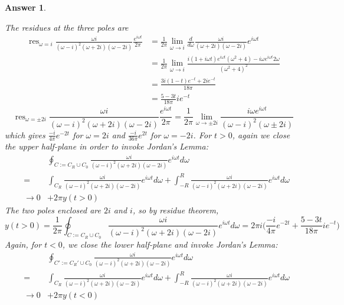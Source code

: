 \documentclass[a4paper]{article}
\DeclareMathOperator{\res}{res}
\newtheorem{ans}{Answer}[section]
\theoremstyle{new}
\begin{document}
\begin{ans}
\begin{enumerate}[label=(\alph*)]
\begin{center}
  \end{center}
The residues at the three poles are
\begin{align}
\res_{\omega=i}\frac{\omega i}{(\omega-i)^2(\omega+2i)(\omega-2i)}\frac{e^{i\omega t}}{2\pi}&=\frac{1}{2\pi}\lim_{\omega\rightarrow i}\frac{d}{d\omega}\frac{\omega i}{(\omega+2i)(\omega-2i)}e^{i\omega t}\nonumber\\&=\frac{1}{2\pi}\lim_{\omega\rightarrow i}\frac{i(1+i\omega t)e^{i\omega t}(\omega^2+4)-i\omega e^{i\omega t}2\omega}{(\omega^2+4)^2}\nonumber\\&=\frac{3i(1-t)e^{-t}+2ie^{-t}}{18\pi}\nonumber\\&=\frac{5-3t}{18\pi}ie^{-t}\nonumber
\end{align}
$$\res_{\omega=\pm 2i}\frac{\omega i}{(\omega-i)^2(\omega+2i)(\omega-2i)}\frac{e^{i\omega t}}{2\pi}=\frac{1}{2\pi}\lim_{\omega\rightarrow\pm 2i}\frac{i\omega e^{i\omega t}}{(\omega-i)^2(\omega\pm 2i)}$$
which gives $\frac{-i}{4\pi}e^{-2t}$ for $\omega=2i$ and $\frac{-i}{36\pi}e^{2t}$ for $\omega=-2i$. For $t>0$, again we close the upper half-plane in order to invoke Jordan's Lemma:
\begin{eqnarray}
&&\oint_{C:=C_R\cup C_0}\frac{\omega i}{(\omega-i)^2(\omega+2i)(\omega-2i)}e^{i\omega t}d\omega\nonumber\\&=&\int_{C_R}\frac{\omega i}{(\omega-i)^2(\omega+2i)(\omega-2i)}e^{i\omega t}d\omega+\int_{-R}^R\frac{\omega i}{(\omega-i)^2(\omega+2i)(\omega-2i)}e^{i\omega t}d\omega\nonumber\\&\rightarrow 0&+2\pi y(t>0)\nonumber
\end{eqnarray}
The two poles enclosed are $2i$ and $i$, so by residue theorem,
$$y(t>0)=\frac{1}{2\pi}\oint_{C:=C_R\cup C_0}\frac{\omega i}{(\omega-i)^2(\omega+2i)(\omega-2i)}e^{i\omega t}d\omega=2\pi i\bigg(\frac{-i}{4\pi}e^{-2t}+\frac{5-3t}{18\pi}ie^{-t}\bigg)$$
Again, for $t<0$, we close the lower half-plane and invoke Jordan's Lemma:
\begin{eqnarray}
&&\oint_{C':=C_R'\cup C_0}\frac{\omega i}{(\omega-i)^2(\omega+2i)(\omega-2i)}e^{i\omega t}d\omega\nonumber\\&=&\int_{C_R}\frac{\omega i}{(\omega-i)^2(\omega+2i)(\omega-2i)}e^{i\omega t}d\omega+\int_{-R}^R\frac{\omega i}{(\omega-i)^2(\omega+2i)(\omega-2i)}e^{i\omega t}d\omega\nonumber\\&\rightarrow 0&+2\pi y(t<0)\nonumber

\end{eqnarray}
\end{enumerate}
\end{ans}
\end{document}
